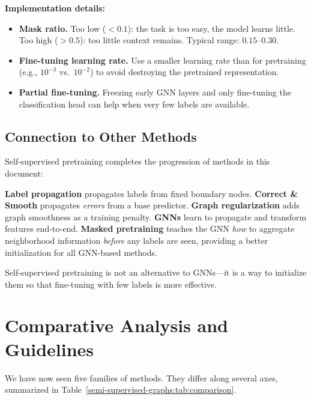 \begin{notechapter}
\begin{warningbox}
\textbf{Implementation details:}
\begin{itemize}
    \item \textbf{Mask ratio.} Too low ($<0.1$): the task is too easy, the
          model learns little. Too high ($>0.5$): too little context remains.
          Typical range: $0.15$--$0.30$.
    \item \textbf{Fine-tuning learning rate.} Use a smaller learning rate
          than for pretraining (e.g., $10^{-3}$ vs.\ $10^{-2}$) to avoid
          destroying the pretrained representation.
    \item \textbf{Partial fine-tuning.} Freezing early GNN layers and only
          fine-tuning the classification head can help when very few labels
          are available.
\end{itemize}
\end{warningbox}

\subsection{Connection to Other Methods}

Self-supervised pretraining completes the progression of methods in this
document:

\textbf{Label propagation} propagates labels from fixed boundary nodes.
\textbf{Correct \& Smooth} propagates \emph{errors} from a base predictor.
\textbf{Graph regularization} adds graph smoothness as a training penalty.
\textbf{GNNs} learn to propagate and transform features end-to-end.
\textbf{Masked pretraining} teaches the GNN \emph{how} to aggregate
neighborhood information \emph{before} any labels are seen, providing a
better initialization for all GNN-based methods.

Self-supervised pretraining is not an alternative to GNNs---it is a way to
initialize them so that fine-tuning with few labels is more effective.

\section{Comparative Analysis and Guidelines}
\label{semi-supervised-graphs:sec:compare}

We have now seen five families of methods. They differ along several axes,
summarized in Table~\ref{semi-supervised-graphs:tab:comparison}.


\end{notechapter}
